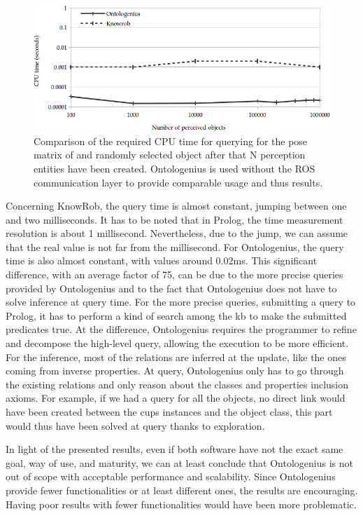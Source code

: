 \begin{figure}[ht!]
\centering
\includegraphics[width=\textwidth]{figures/chapter2/knowrob/Query.png}
\caption{\label{fig:chap2_knowrob_query} Comparison of the required CPU time for querying for the pose matrix of and randomly selected object after that N perception entities have been created. Ontologenius is used without the ROS communication layer to provide comparable usage and thus results.}
\end{figure}

Concerning KnowRob, the query time is almost constant, jumping between one and two milliseconds. It has to be noted that in Prolog, the time measurement resolution is about 1 millisecond. Nevertheless, due to the jump, we can assume that the real value is not far from the millisecond. For Ontologenius, the query time is also almost constant, with values around 0.02ms. This significant difference, with an average factor of 75, can be due to the more precise queries provided by Ontologenius and to the fact that Ontologenius does not have to solve inference at query time. For the more precise queries, submitting a query to Prolog, it has to perform a kind of search among the \acrshort{kb} to make the submitted predicates true. At the difference, Ontologenius requires the programmer to refine and decompose the high-level query, allowing the execution to be more efficient. For the inference, most of the relations are inferred at the update, like the ones coming from inverse properties. At query, Ontologenius only has to go through the existing relations and only reason about the classes and properties inclusion axioms. For example, if we had a query for all the objects, no direct link would have been created between the cups instances and the object class, this part would thus have been solved at query thanks to exploration.

In light of the presented results, even if both software have not the exact same goal, way of use, and maturity, we can at least conclude that Ontologenius is not out of scope with acceptable performance and scalability. Since Ontologenius provide fewer functionalities or at least different ones, the results are encouraging. Having poor results with fewer functionalities would have been more problematic.

